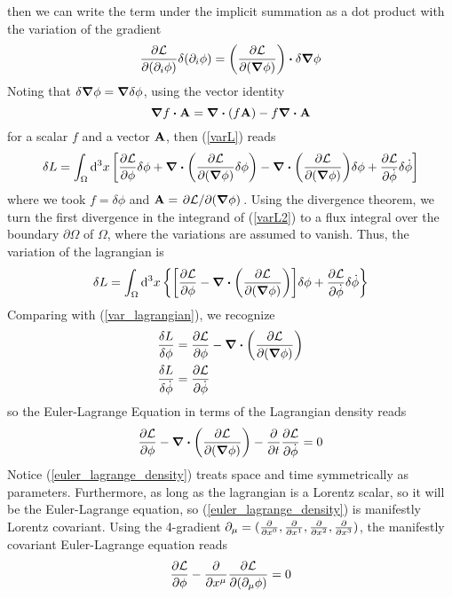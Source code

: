 then we can write the term under the implicit summation as a dot product with the variation of the gradient
\begin{equation}
    \pdv{\mathcal{L}}{(\partial_i\phi)}\delta(\partial_i\phi)=\qty(\pdv{\mathcal{L}}{(\grad\phi)})\vdot\delta\grad\phi
\end{equation}
Noting that $\delta\grad\phi=\grad\delta\phi$, using the vector identity 
\begin{equation}
    \grad f \vdot \vb{A}=\div(f\vb{A})-f\div\vb{A}
    \label{vec_id}
\end{equation}
for a scalar $f$ and a vector $\vb{A}$, then (\ref{varL}) reads
\begin{equation}
   \delta L =  \int_{\Omega}\dd^3x\,\qty[\pdv{\mathcal{L}}{\phi}\delta\phi+\div\qty(\pdv{\mathcal{L}}{(\grad\phi)}\delta\phi)-\div{\qty(\pdv{\mathcal{L}}{(\grad\phi)})}\delta\phi+\pdv{\mathcal{L}}{\dot{\phi}}\delta\dot{\phi}]
   \label{varL2}
\end{equation}
where we took $f=\delta\phi$ and $\vb{A}=\pdv*{\mathcal{L} }{(\grad\phi)}$. Using the divergence theorem, we turn the first divergence in the integrand of (\ref{varL2}) to a flux integral over the boundary $\partial\Omega$ of $\Omega$, where the variations are assumed to vanish. Thus, the variation of the lagrangian is
\begin{equation}
   \delta L =  \int_{\Omega}\dd^3x\,\qty{\qty[\pdv{\mathcal{L}}{\phi}-\div{\qty(\pdv{\mathcal{L}}{(\grad\phi)})}]\delta\phi+\pdv{\mathcal{L}}{\dot{\phi}}\delta\dot{\phi}}
\end{equation}
Comparing with (\ref{var_lagrangian}), we recognize
\begin{equation}
\begin{aligned}
    \fdv{L}{\phi}&= \pdv{\mathcal{L}}{\phi}-\div{\qty(\pdv{\mathcal{L}}{(\grad\phi)})}\\
    \fdv{L}{\dot\phi}&= \pdv{\mathcal{L}}{\dot\phi}
\end{aligned}
\label{functional_to_function_eom_terms}
\end{equation}
so the Euler-Lagrange Equation in terms of the Lagrangian density reads
\begin{equation}
    \pdv{\mathcal{L}}{\phi}-\div{\qty(\pdv{\mathcal{L}}{(\grad\phi)})}-\pdv{t}\pdv{\mathcal{L}}{\dot\phi}=0
    \label{euler_lagrange_density}
\end{equation}
Notice (\ref{euler_lagrange_density}) treats space and time symmetrically as parameters. Furthermore, as long as the lagrangian is a Lorentz scalar, so it will be the Euler-Lagrange equation, so (\ref{euler_lagrange_density}) is manifestly Lorentz covariant.
Using the 4-gradient $\partial_\mu=(\pdv{x^0},\pdv{x^1},\pdv{x^2},\pdv{x^3})$, the manifestly covariant Euler-Lagrange equation reads
\begin{equation}
    \pdv{\mathcal{L}}{\phi}-\pdv{x^\mu}\pdv{\mathcal{L}}{(\partial_\mu\phi)}=0
\end{equation}

